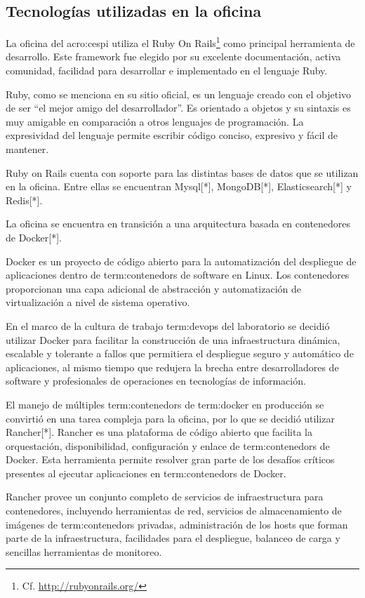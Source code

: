 \subsection{Tecnologías utilizadas en la oficina}
\label{tecnologias_utilizadas}

La oficina del \gls{acro:cespi} utiliza el   Ruby On
Rails\footnote{Cf.  \url{http://rubyonrails.org/}} como principal herramienta
de desarrollo. Este framework fue elegido por su excelente documentación,
activa comunidad, facilidad para desarrollar e implementado en el lenguaje
Ruby.

Ruby, como se menciona en su sitio oficial, es un lenguaje creado con el
objetivo de ser “el mejor amigo del desarrollador”. Es orientado a objetos y su
sintaxis es muy amigable en comparación a otros lenguajes de programación. La
expresividad del lenguaje permite escribir código conciso, expresivo y fácil de
mantener.

Ruby on Rails cuenta con soporte para las distintas bases de datos que se
utilizan en la oficina. Entre ellas se encuentran Mysql[*], MongoDB[*],
Elasticsearch[*] y Redis[*].

La oficina se encuentra en transición a una arquitectura basada en contenedores
de Docker[*].

Docker es un proyecto de código abierto para la automatización del despliegue
de aplicaciones dentro de \glspl{term:contenedor} de software en Linux. Los contenedores
proporcionan una capa adicional de abstracción y automatización de
virtualización a nivel de sistema operativo.

En el marco de la cultura de trabajo \gls{term:devops} del laboratorio se decidió utilizar
Docker para facilitar la construcción de una infraestructura dinámica,
escalable y tolerante a fallos que permitiera el despliegue seguro y automático
de aplicaciones, al mismo tiempo que redujera la brecha entre desarrolladores
de software y profesionales de operaciones en tecnologías de información.

El manejo de múltiples \glspl{term:contenedor} de \gls{term:docker} en producción se convirtió en una
tarea compleja para la oficina, por lo que se decidió utilizar Rancher[*].
Rancher es una plataforma de código abierto que facilita la orquestación,
disponibilidad, configuración y enlace de \glspl{term:contenedor} de Docker. Esta
herramienta permite resolver gran parte de los desafíos críticos presentes al
ejecutar aplicaciones en \glspl{term:contenedor} de Docker.

Rancher provee un conjunto completo de servicios de infraestructura para
contenedores, incluyendo herramientas de red, servicios de almacenamiento de
imágenes de \glspl{term:contenedor} privadas, administración de los hosts que forman parte
de la infraestructura, facilidades para el despliegue, balanceo de carga y
sencillas herramientas de monitoreo.
